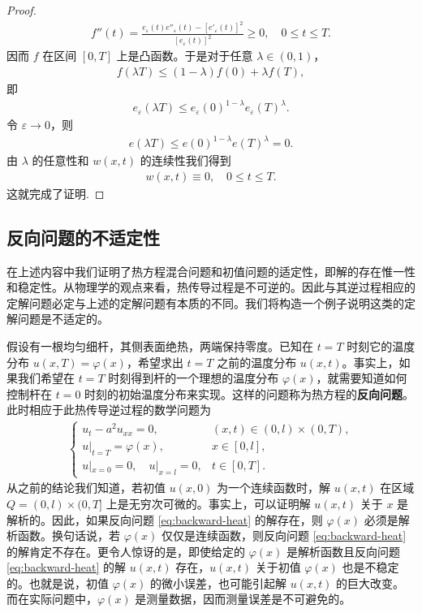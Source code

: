 \documentclass[../../main.tex]{subfiles}%
\begin{document}
\begin{proof}
\begin{align*}
f''(t)=\frac{e_\varepsilon(t)e''_\varepsilon(t)-[e'_\varepsilon(t)]^2}{[e_\varepsilon(t)]^2}\geqslant 0,\quad 0\leqslant t\leqslant T.
\end{align*}
因而 $f$ 在区间 $[0,T]$ 上是凸函数。于是对于任意 $\lambda\in(0,1)$，
\begin{align*}
f(\lambda T)\leqslant (1-\lambda)f(0)+\lambda f(T),
\end{align*}
即
\begin{align*}
e_\varepsilon(\lambda T)\leqslant e_\varepsilon(0)^{1-\lambda}e_\varepsilon(T)^\lambda.
\end{align*}
令 $\varepsilon\to 0$，则
\begin{align*}
e(\lambda T)\leqslant e(0)^{1-\lambda}e(T)^\lambda=0.
\end{align*}
由 $\lambda$ 的任意性和 $w(x,t)$ 的连续性我们得到
\begin{align*}
w(x,t)\equiv 0,\quad 0\leqslant t\leqslant T.
\end{align*}
这就完成了证明.
\end{proof}

\subsection{反向问题的不适定性}

在上述内容中我们证明了热方程混合问题和初值问题的适定性，即解的存在惟一性和稳定性。从物理学的观点来看，热传导过程是不可逆的。因此与其逆过程相应的定解问题必定与上述的定解问题有本质的不同。我们将构造一个例子说明这类的定解问题是不适定的。

假设有一根均匀细杆，其侧表面绝热，两端保持零度。已知在 $t=T$ 时刻它的温度分布 $u(x,T)=\varphi(x)$，希望求出 $t=T$ 之前的温度分布 $u(x,t)$。事实上，如果我们希望在 $t=T$ 时刻得到杆的一个理想的温度分布 $\varphi(x)$，就需要知道如何控制杆在 $t=0$ 时刻的初始温度分布来实现。这样的问题称为热方程的\textbf{反向问题}。此时相应于此热传导逆过程的数学问题为
\begin{align}
\begin{cases}
u_t-a^2u_{xx}=0, & (x,t)\in(0,l)\times(0,T),\\
u|_{t=T}=\varphi(x), & x\in[0,l],\\
u|_{x=0}=0,\quad u|_{x=l}=0, & t\in[0,T].
\end{cases} \label{eq:backward-heat}
\end{align}
从之前的结论我们知道，若初值 $u(x,0)$ 为一个连续函数时，解 $u(x,t)$ 在区域 $Q=(0,l)\times(0,T]$ 上是无穷次可微的。事实上，可以证明解 $u(x,t)$ 关于 $x$ 是解析的。因此，如果反向问题 \eqref{eq:backward-heat} 的解存在，则 $\varphi(x)$ 必须是解析函数。换句话说，若 $\varphi(x)$ 仅仅是连续函数，则反向问题 \eqref{eq:backward-heat} 的解肯定不存在。更令人惊讶的是，即使给定的 $\varphi(x)$ 是解析函数且反向问题 \eqref{eq:backward-heat} 的解 $u(x,t)$ 存在，$u(x,t)$ 关于初值 $\varphi(x)$ 也是不稳定的。也就是说，初值 $\varphi(x)$ 的微小误差，也可能引起解 $u(x,t)$ 的巨大改变。而在实际问题中，$\varphi(x)$ 是测量数据，因而测量误差是不可避免的。
\end{document}
